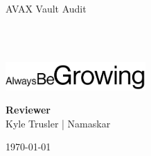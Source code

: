 \begin{titlepage}
  \vbox{}
  \vbox{}

  \begin{center}


    \noindent\makebox[\linewidth]{\rule{.7\paperwidth}{.6pt}}\\[0.7cm]

    { \huge \bfseries

      AVAX Vault Audit
    }\\[0.25cm]
    
    \noindent\makebox[\linewidth]{\rule{.7\paperwidth}{.6pt}}\\[0.7cm]

    \vfill

    \includegraphics[width=0.40\textwidth]{img/abg_wordmark.png}

    
    \large
    {\bfseries Reviewer}\\
    
    Kyle Trusler | Namaskar

    {\large \today}

  \end{center}

\end{titlepage}